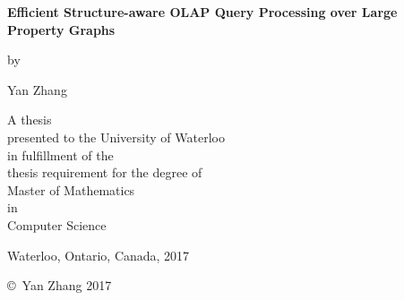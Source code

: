 \pagestyle{empty}

\begin{titlepage}
        \begin{center}
        \vspace*{1.0cm}

        \Huge
        {\bf Efficient Structure-aware OLAP Query Processing over Large Property Graphs}

        \vspace*{1.0cm}

        \normalsize
        by \\

        \vspace*{1.0cm}

        \Large
        Yan Zhang \\

        \vspace*{3.0cm}

        \normalsize
        A thesis \\
        presented to the University of Waterloo \\ 
        in fulfillment of the \\
        thesis requirement for the degree of \\
        Master of Mathematics \\
        in \\
        Computer Science \\

        \vspace*{2.0cm}

        Waterloo, Ontario, Canada, 2017 \\

        \vspace*{1.0cm}

        \copyright\ Yan Zhang 2017 \\
        \end{center}
\end{titlepage}

\pagestyle{plain}
\setcounter{page}{2}

